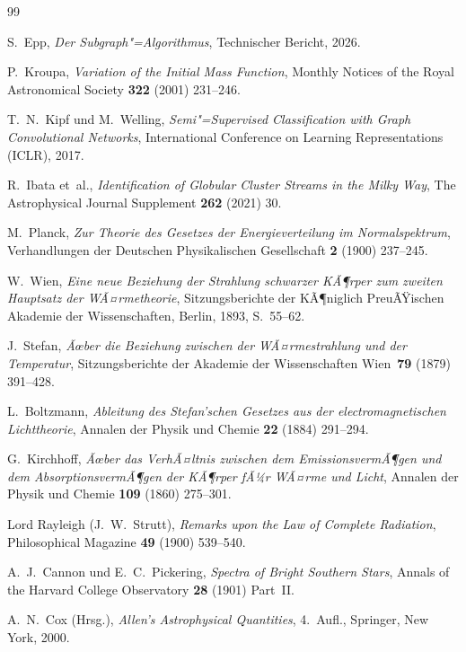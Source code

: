 ﻿\documentclass[a4paper,12pt]{article}
\theoremstyle{definition}
\begin{document}
\begin{thebibliography}{99}

S.~Epp,
\textit{Der Subgraph"=Algorithmus},
Technischer Bericht, 2026.

P.~Kroupa,
\textit{Variation of the Initial Mass Function},
Monthly Notices of the Royal Astronomical Society \textbf{322} (2001) 231--246.

T.~N.~Kipf und M.~Welling,
\textit{Semi"=Supervised Classification with Graph Convolutional Networks},
International Conference on Learning Representations (ICLR), 2017.

R.~Ibata et~al.,
\textit{Identification of Globular Cluster Streams in the Milky Way},
The Astrophysical Journal Supplement \textbf{262} (2021) 30.

M.~Planck,
\textit{Zur Theorie des Gesetzes der Energieverteilung im Normalspektrum},
Verhandlungen der Deutschen Physikalischen Gesellschaft \textbf{2} (1900) 237--245.

W.~Wien,
\textit{Eine neue Beziehung der Strahlung schwarzer KÃ¶rper zum zweiten
Hauptsatz der WÃ¤rmetheorie},
Sitzungsberichte der KÃ¶niglich PreuÃŸischen Akademie der Wissenschaften,
Berlin, 1893, S.~55--62.

J.~Stefan,
\textit{Ãœber die Beziehung zwischen der WÃ¤rmestrahlung und der Temperatur},
Sitzungsberichte der Akademie der Wissenschaften Wien~\textbf{79} (1879) 391--428.

L.~Boltzmann,
\textit{Ableitung des Stefan'schen Gesetzes aus der electromagnetischen
Lichttheorie},
Annalen der Physik und Chemie \textbf{22} (1884) 291--294.

G.~Kirchhoff,
\textit{Ãœber das VerhÃ¤ltnis zwischen dem EmissionsvermÃ¶gen und dem
AbsorptionsvermÃ¶gen der KÃ¶rper fÃ¼r WÃ¤rme und Licht},
Annalen der Physik und Chemie \textbf{109} (1860) 275--301.

Lord Rayleigh (J.~W.~Strutt),
\textit{Remarks upon the Law of Complete Radiation},
Philosophical Magazine \textbf{49} (1900) 539--540.

A.~J.~Cannon und E.~C.~Pickering,
\textit{Spectra of Bright Southern Stars},
Annals of the Harvard College Observatory \textbf{28} (1901) Part~II.

A.~N.~Cox (Hrsg.),
\textit{Allen's Astrophysical Quantities}, 4.~Aufl.,
Springer, New York, 2000.


\end{thebibliography}
\end{document}

